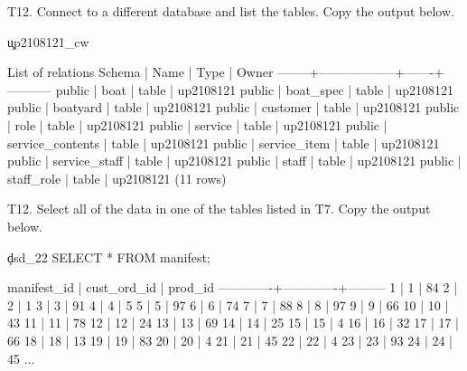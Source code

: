 T12. Connect to a different database and list the tables. Copy the output below.
\begin{pseudo}
\c up2108121_cw
\dt

List of relations
Schema |       Name       | Type  |   Owner
--------+------------------+-------+-----------
public | boat             | table | up2108121
public | boat_spec        | table | up2108121
public | boatyard         | table | up2108121
public | customer         | table | up2108121
public | role             | table | up2108121
public | service          | table | up2108121
public | service_contents | table | up2108121
public | service_item     | table | up2108121
public | service_staff    | table | up2108121
public | staff            | table | up2108121
public | staff_role       | table | up2108121
(11 rows)
\end{pseudo}

T12. Select all of the data in one of the tables listed in T7. Copy the output below.
\begin{sql}
\c dsd_22
SELECT * FROM manifest;
\end{sql}
\begin{pseudo}
 manifest_id | cust_ord_id | prod_id
-------------+-------------+---------
           1 |           1 |      84
           2 |           2 |       1
           3 |           3 |      91
           4 |           4 |       5
           5 |           5 |      97
           6 |           6 |      74
           7 |           7 |      88
           8 |           8 |      97
           9 |           9 |      66
          10 |          10 |      43
          11 |          11 |      78
          12 |          12 |      24
          13 |          13 |      69
          14 |          14 |      25
          15 |          15 |       4
          16 |          16 |      32
          17 |          17 |      66
          18 |          18 |      13
          19 |          19 |      83
          20 |          20 |       4
          21 |          21 |      45
          22 |          22 |       4
          23 |          23 |      93
          24 |          24 |      45
...
\end{pseudo}